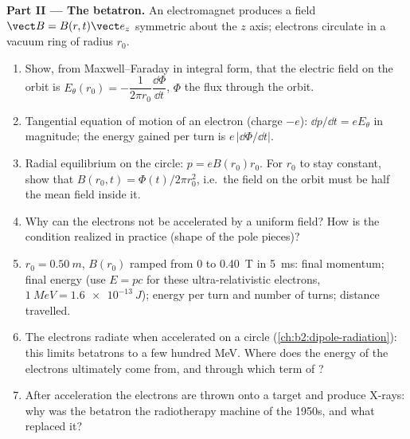 \begin{problem}
\medskip
\noindent\textbf{Part II --- The betatron.}
An electromagnet produces a field $\vect B = B(r, t)\vect e_z$ symmetric
about the $z$ axis; electrons circulate in a vacuum ring of radius $r_0$.
\begin{enumerate}[resume]
  \item Show, from Maxwell--Faraday in integral form, that the
        electric field on the orbit is $E_\theta(r_0) = -\dfrac1{2\pi r_0}
        \dfrac{\dd\Phi}{\dd t}$, $\Phi$ the flux through the orbit.
  \item Tangential equation of motion of an electron (charge $-e$):
        $\dd p/\dd t = eE_\theta$ in magnitude; the energy gained per turn is
        $e\,|\dd\Phi/\dd t|$.
  \item Radial equilibrium on the circle: $p = eB(r_0)r_0$. For $r_0$ to
        stay constant, show that $B(r_0, t) = \Phi(t)/2\pi r_0^2$, i.e.\ the
        field on the orbit must be half the mean field inside it.
  \item Why can the electrons not be accelerated by a uniform field?
        How is the condition realized in practice (shape of the pole
        pieces)?
  \item $r_0 = \qty{0.50}{m}$, $B(r_0)$ ramped from $0$ to \qty{0.40}{T} in
        \qty{5}{ms}: final momentum; final energy (use $E = pc$ for these
        ultra-relativistic electrons, $\qty{1}{MeV} = \qty{1.6e-13}{J}$);
        energy per turn and number of turns; distance travelled.
  \item The electrons radiate when accelerated on a circle
        (\cref{ch:b2:dipole-radiation}): this limits betatrons to a few
        hundred MeV. Where does the energy of the electrons ultimately
        come from, and through which term of ?
  \item After acceleration the electrons are thrown onto a target and
        produce X-rays: why was the betatron the radiotherapy machine
        of the 1950s, and what replaced it?
\end{enumerate}


\end{problem}
